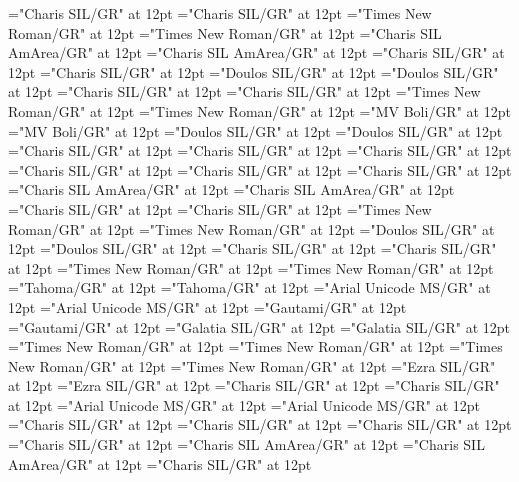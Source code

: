 \documentclass[a4paper,twoside]{article}
\begin{document}
\pagestyle{plain}
\sloppy
\setlength{\parfillskip}{0pt plus 1fil}
\font\picturepictureRight="Charis SIL/GR" at 12pt
\font\imgpicturedivpictureLeft="Charis SIL/GR" at 12pt
\font\divarIQ="Times New Roman/GR" at 12pt
\font\spanarIQ="Times New Roman/GR" at 12pt
\font\divblz="Charis SIL AmArea/GR" at 12pt
\font\spanblz="Charis SIL AmArea/GR" at 12pt
\font\divbn="Charis SIL/GR" at 12pt
\font\spanbn="Charis SIL/GR" at 12pt
\font\divbzhfonipa="Doulos SIL/GR" at 12pt
\font\spanbzhfonipa="Doulos SIL/GR" at 12pt
\font\divbzh="Charis SIL/GR" at 12pt
\font\spanbzh="Charis SIL/GR" at 12pt
\font\divde="Times New Roman/GR" at 12pt
\font\spande="Times New Roman/GR" at 12pt
\font\divdv="MV Boli/GR" at 12pt
\font\spandv="MV Boli/GR" at 12pt
\font\divenfonipa="Doulos SIL/GR" at 12pt
\font\spanenfonipa="Doulos SIL/GR" at 12pt
\font\divenGB="Charis SIL/GR" at 12pt
\font\spanenGB="Charis SIL/GR" at 12pt
\font\divenPH="Charis SIL/GR" at 12pt
\font\spanenPH="Charis SIL/GR" at 12pt
\font\diven="Charis SIL/GR" at 12pt
\font\spanen="Charis SIL/GR" at 12pt
\font\divesaab="Charis SIL AmArea/GR" at 12pt
\font\spanesaab="Charis SIL AmArea/GR" at 12pt
\font\dives="Charis SIL/GR" at 12pt
\font\spanes="Charis SIL/GR" at 12pt
\font\divfa="Times New Roman/GR" at 12pt
\font\spanfa="Times New Roman/GR" at 12pt
\font\divfrfonipa="Doulos SIL/GR" at 12pt
\font\spanfrfonipa="Doulos SIL/GR" at 12pt
\font\divfrZxxxxaudio="Charis SIL/GR" at 12pt
\font\spanfrZxxxxaudio="Charis SIL/GR" at 12pt
\font\divfr="Times New Roman/GR" at 12pt
\font\spanfr="Times New Roman/GR" at 12pt
\font\divggofonipaxemic="Tahoma/GR" at 12pt
\font\spanggofonipaxemic="Tahoma/GR" at 12pt
\font\divggoINxaheri="Arial Unicode MS/GR" at 12pt
\font\spanggoINxaheri="Arial Unicode MS/GR" at 12pt
\font\divggoTeluIN="Gautami/GR" at 12pt
\font\spanggoTeluIN="Gautami/GR" at 12pt
\font\divgrc="Galatia SIL/GR" at 12pt
\font\spangrc="Galatia SIL/GR" at 12pt
\font\divhagLatnGHfonipaxemic="Times New Roman/GR" at 12pt
\font\spanhagLatnGHfonipaxemic="Times New Roman/GR" at 12pt
\font\divhag="Times New Roman/GR" at 12pt
\font\spanhag="Times New Roman/GR" at 12pt
\font\divhbo="Ezra SIL/GR" at 12pt
\font\spanhbo="Ezra SIL/GR" at 12pt
\font\divhe="Charis SIL/GR" at 12pt
\font\spanhe="Charis SIL/GR" at 12pt
\font\divhi="Arial Unicode MS/GR" at 12pt
\font\spanhi="Arial Unicode MS/GR" at 12pt
\font\divhu="Charis SIL/GR" at 12pt
\font\spanhu="Charis SIL/GR" at 12pt
\font\divibafonipa="Charis SIL/GR" at 12pt
\font\spanibafonipa="Charis SIL/GR" at 12pt
\font\diviba="Charis SIL AmArea/GR" at 12pt
\font\spaniba="Charis SIL AmArea/GR" at 12pt
\font\dividZxxxxaudio="Charis SIL/GR" at 12pt
\end{document}

